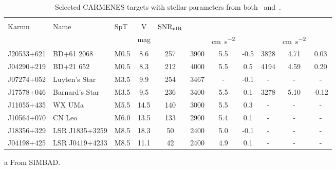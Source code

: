
\begin{table}[h]
    \centering
    \begin{threeparttable}
        \caption[{CARMENES} targets for {RV} precision analysis.]{Selected {CARMENES} targets with stellar parameters from both~\citet{rajpurohit_exploring_2018} and~\citet{passegger_carmenes_2018}.}
        \begin{tabular}{lllcccccccc}
            \toprule
            & & & & & \multicolumn{3}{c}{\citet{rajpurohit_exploring_2018}} & \multicolumn{3}{c}{\citet{passegger_carmenes_2018}} \\
            Karmn & Name & SpT & V & \(\textrm{SNR}{}_{\textrm{nIR}{}}\) & \Teff{} & \Logg{} & \feh{} & \Teff{} & \Logg{} & \feh{} \\
            &  &  & mag &  & \K{} & \si{\centi\metre\per\second\squared} & & \K{} & \si{\centi\metre\per\second\squared} &  \\
            \midrule
            J20533+621 & BD+61 2068     & M0.5 & 8.6  & 257 & 3900          & 5.5 & -0.5           & 3828 & 4.71 & 0.03 \\
            J04290+219 & BD+21 652      & M0.5 & 8.3  & 212 & 4000          & 5.5 & 0.5            & 4194 & 4.59 & 0.20 \\
            J07274+052 & Luyten's Star  & M3.5 & 9.9  & 254 & 3467\tnote{a} & -   & -0.1\tnote{a}  & -    & -    & -    \\
            J17578+046 & Barnard's Star & M3.5 & 9.5  & 236 & 3400          & 5.5 & 0.1            & 3278 & 5.10 & -0.12 \\
            J11055+435 & WX UMa         & M5.5 & 14.5 & 140 & 3000          & 5.5 & 0.3 & - & - & - \\
            J10564+070 & CN Leo         & M6.0 & 13.5 & 133 & 2900          & 5.4 & 0.1 & - & - & - \\
            J18356+329 & LSR J1835+3259 & M8.5 & 18.3 & 50  & 2400          & 5.0 &-0.1 & - & - & - \\
            J04198+425 & LSR J0419+4233 & M8.5 & 11.1 & 42  & 2400          & 4.9 & 0.1 & - & - & - \\
        \bottomrule
        \end{tabular}\label{tab:carmenes_selection_updated}
        \begin{tablenotes}
            \item [a] {From SIMBAD.}
        \end{tablenotes}
    \end{threeparttable}
\end{table}
